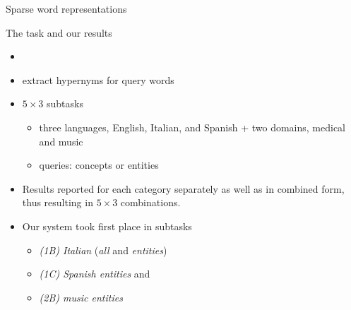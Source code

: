 \documentclass{beamer}
\newlength{\onecolwid}
\begin{document}
\begin{frame}[t]
\begin{columns}[t]
\begin{column}{\onecolwid}
\begin{block}{Sparse word representations}
\begin{itemize}
        \end{itemize}
      \end{block}

      \begin{block}{The task and our results}
        \begin{itemize}
          \item \cite{Camacho-Collados:2018} 
          \item extract hypernyms for query words 
          \item $5\times 3$ subtasks 
            \begin{itemize}
              \item three languages, English, Italian, and Spanish + 
                two domains, medical and music
              \item queries: concepts or entities
            \end{itemize}
          \item Results reported for each category separately as well as in
            combined form, thus resulting in $5\times 3$ combinations.  
          \item Our system took first place in subtasks 
            \begin{itemize}
              \item \emph{(1B) Italian} (\emph{all} and \emph{entities})
              \item \emph{(1C) Spanish entities} and 
              \item \emph{(2B) music entities}
            \end{itemize}
        \end{itemize}
      \end{block}


\end{column}
\end{columns}
\end{frame}
\end{document}

